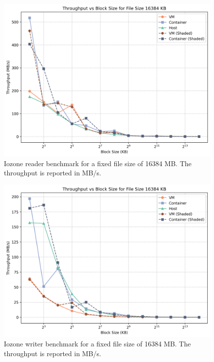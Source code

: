 \begin{figure}
    \centering
    \includegraphics[width=0.8\linewidth]{assets/reader_filesize_16384.png}
    \caption{Iozone reader benchmark for a fixed file size of 16384 MB. The throughput is reported in MB/s.}
    \label{fig:reader_filesize_1024}
\end{figure}

\begin{figure}
    \centering
    \includegraphics[width=0.8\linewidth]{assets/writer_filesize_16384.png}
    \caption{Iozone writer benchmark for a fixed file size of 16384 MB. The throughput is reported in MB/s.}
    \label{fig:writer_filesize_1024}
\end{figure}

